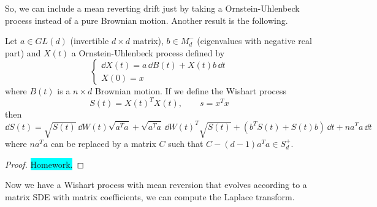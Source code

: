 So, we can include a mean reverting drift just by taking a Ornstein-Uhlenbeck process instead of a pure Brownian motion. Another result is the following.
\begin{theorem}
    Let $a\in GL(d)$ (invertible $d\times d$ matrix), $b\in M_d^-$ (eigenvalues with negative real part) and $X(t)$ a Ornstein-Uhlenbeck process defined by
    \begin{equation}
        \begin{cases}
            \dd X(t) = a\,\dd B(t) + X(t)b\,\dd t \\
            X(0) = x
        \end{cases}
    \end{equation}
    where $B(t)$ is a $n\times d$ Brownian motion. If we define the Wishart process
    \begin{equation}
        S(t) = X(t)^TX(t), \qquad s = x^Tx
    \end{equation}
    then
    \begin{equation}
        \dd S(t) = \sqrt{S(t)}\,\dd W(t)\sqrt{a^Ta} + \sqrt{a^Ta}\,\dd W(t)^T\sqrt{S(t)} + (b^TS(t) + S(t)b)\,\dd t + na^Ta\,\dd t
    \end{equation}
    where $na^Ta$ can be replaced by a matrix $C$ such that $C - (d-1)a^Ta \in S^+_d$.
\end{theorem}
\begin{proof}
    \colorbox{cyan}{Homework.}
\end{proof}
Now we have a Wishart process with mean reversion that evolves according to a matrix SDE with matrix coefficients, we can compute the Laplace transform.

